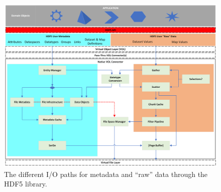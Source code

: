 \begin{landscape}
\begin{figure}
\centering
\includegraphics[scale=0.74,angle=90]{images/HDF5 library meta data.png}
\caption{The different I/O paths for metadata and ``raw'' data through the HDF5 library.\label{fig:io-paths}}
\end{figure}
\end{landscape}
